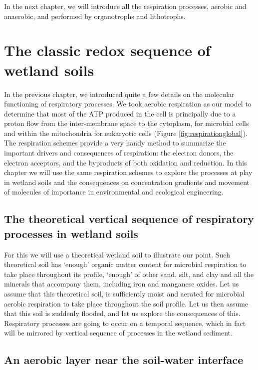 \documentclass[]{book}
\theoremstyle{definition}
\theoremstyle{definition}
\theoremstyle{definition}
\theoremstyle{remark}
\begin{document}
In the next chapter, we will introduce all the respiration processes,
aerobic and anaerobic, and performed by organotrophs and lithotrophs.

\chapter{The classic redox sequence of wetland
soils}\label{the-classic-redox-sequence-of-wetland-soils}

In the previous chapter, we introduced quite a few details on the
molecular functioning of respiratory processes. We took aerobic
respiration as our model to determine that most of the ATP produced in
the cell is principally due to a proton flow from the inter-membrane
space to the cytoplasm, for microbial cells and within the mitochondria
for eukaryotic cells (Figure \ref{fig:respirationglobal}). The
respiration schemes provide a very handy method to summarize the
important drivers and consequences of respiration: the electron donors,
the electron acceptors, and the byproducts of both oxidation and
reduction. In this chapter we will use the same respiration schemes to
explore the processes at play in wetland soils and the consequences on
concentration gradients and movement of molecules of importance in
environmental and ecological engineering.

\section{The theoretical vertical sequence of respiratory processes in
wetland
soils}\label{the-theoretical-vertical-sequence-of-respiratory-processes-in-wetland-soils}

For this we will use a theoretical wetland soil to illustrate our point.
Such theoretical soil has `enough' organic matter content for microbial
respiration to take place throughout its profile, `enough' of other
sand, silt, and clay and all the minerals that accompany them, including
iron and manganese oxides. Let us assume that this theoretical soil, is
sufficiently moist and aerated for microbial aerobic respiration to take
place throughout the soil profile. Let us then assume that this soil is
suddenly flooded, and let us explore the consequences of this.
Respiratory processes are going to occur on a temporal sequence, which
in fact will be mirrored by vertical sequence of processes in the
wetland sediment.

\section{An aerobic layer near the soil-water
interface}\label{an-aerobic-layer-near-the-soil-water-interface}
\end{document}
